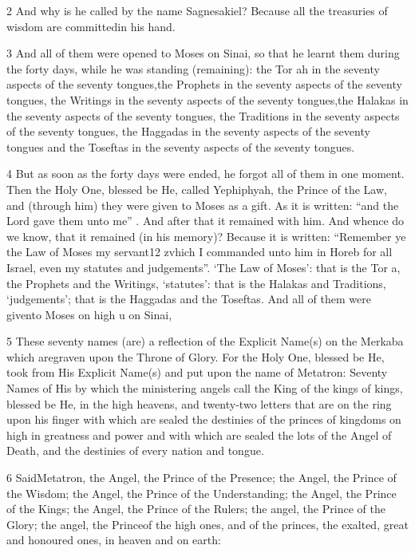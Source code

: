 \par 2 And why is he called by the name Sagnesakiel? Because all the treasuries of wisdom are committedin his hand. 

\par 3 And all of them were opened to Moses on Sinai, so that he learnt them during the forty days, while he was standing (remaining): the Tor ah in the seventy aspects of the seventy tongues,the Prophets in the seventy aspects of the seventy tongues, the Writings in the seventy aspects of the seventy tongues,the Halakas in the seventy aspects of the seventy tongues, the Traditions in the seventy aspects of the seventy tongues, the Haggadas in the seventy aspects of the seventy tongues and the Toseftas in the seventy aspects of the seventy tongues. 

\par 4 But as soon as the forty days were ended, he forgot all of them in one moment. Then the Holy One, blessed be He, called Yephiphyah, the Prince of the Law, and (through him) they were given to Moses as a gift. As it is written: “and the Lord gave them unto me” . And after that it remained with him. And whence do we know, that it remained (in his memory)? Because it is written: “Remember ye the Law of Moses my servant12 zvhich I commanded unto him in Horeb for all Israel, even my statutes and judgements”. ‘The Law of Moses’: that is the Tor a, the Prophets and the Writings, ‘statutes’: that is the Halakas and Traditions, ‘judgements’; that is the Haggadas and the Toseftas. And all of them were givento Moses on high u on Sinai, 

\par 5 These seventy names (are) a reflection of the Explicit Name(s) on the Merkaba which aregraven upon the Throne of Glory. For the Holy One, blessed be He, took from His Explicit Name(s) and put upon the name of Metatron: Seventy Names of His by which the ministering angels call the King of the kings of kings, blessed be He, in the high heavens, and twenty-two letters that are on the ring upon his finger with which are sealed the destinies of the princes of kingdoms on high in greatness and power and with which are sealed the lots of the Angel of Death, and the destinies of every nation and tongue. 

\par 6 SaidMetatron, the Angel, the Prince of the Presence; the Angel, the Prince of the Wisdom; the Angel, the Prince of the Understanding; the Angel, the Prince of the Kings; the Angel, the Prince of the Rulers; the angel, the Prince of the Glory; the angel, the Princeof the high ones, and of the princes, the exalted, great and honoured ones, in heaven and on earth: 

